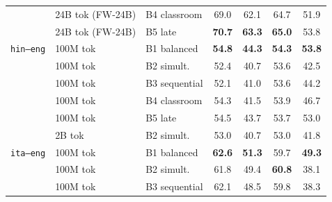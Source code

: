 \begin{table}[t]
\begin{minipage}[t]{0.49\linewidth}
\begin{tabular}{ll l cccc}
 & 24B tok (FW-24B) & B4 classroom & \cellcolor[rgb]{0.804,1.000,0.804} 69.0 & \cellcolor[rgb]{0.852,1.000,0.852} 62.1 & \cellcolor[rgb]{0.805,1.000,0.805} 64.7 & \cellcolor[rgb]{1.000,0.961,0.961} 51.9 \\
 & 24B tok (FW-24B) & B5 late & \cellcolor[rgb]{0.787,1.000,0.787} \textbf{70.7} & \cellcolor[rgb]{0.843,1.000,0.843} \textbf{63.3} & \cellcolor[rgb]{0.802,1.000,0.802} \textbf{65.0} & \cellcolor[rgb]{1.000,0.942,0.942} 53.8 \\
\midrule
\midrule
\texttt{hin--eng} & 100M tok & B1 balanced & \cellcolor[rgb]{0.950,1.000,0.950} \textbf{54.8} & \cellcolor[rgb]{1.000,0.945,0.945} \textbf{44.3} & \cellcolor[rgb]{0.943,1.000,0.943} \textbf{54.3} & \cellcolor[rgb]{0.922,1.000,0.922} \textbf{53.8} \\
 & 100M tok & B2 simult. & \cellcolor[rgb]{0.975,1.000,0.975} 52.4 & \cellcolor[rgb]{1.000,0.910,0.910} 40.7 & \cellcolor[rgb]{0.952,1.000,0.952} 53.6 & \cellcolor[rgb]{1.000,0.917,0.917} 42.5 \\
 & 100M tok & B3 sequential & \cellcolor[rgb]{0.978,1.000,0.978} 52.1 & \cellcolor[rgb]{1.000,0.913,0.913} 41.0 & \cellcolor[rgb]{0.952,1.000,0.952} 53.6 & \cellcolor[rgb]{1.000,0.936,0.936} 44.2 \\
 & 100M tok & B4 classroom & \cellcolor[rgb]{0.955,1.000,0.955} 54.3 & \cellcolor[rgb]{1.000,0.918,0.918} 41.5 & \cellcolor[rgb]{0.948,1.000,0.948} 53.9 & \cellcolor[rgb]{1.000,0.964,0.964} 46.7 \\
 & 100M tok & B5 late & \cellcolor[rgb]{0.953,1.000,0.953} 54.5 & \cellcolor[rgb]{1.000,0.939,0.939} 43.7 & \cellcolor[rgb]{0.951,1.000,0.951} 53.7 & \cellcolor[rgb]{0.939,1.000,0.939} 53.0 \\
\addlinespace[1.5pt]
 & 2B tok & B2 simult. & \cellcolor[rgb]{0.969,1.000,0.969} 53.0 & \cellcolor[rgb]{1.000,0.910,0.910} 40.7 & \cellcolor[rgb]{0.960,1.000,0.960} 53.0 & \cellcolor[rgb]{1.000,0.910,0.910} 41.8 \\
\midrule
\texttt{ita--eng} & 100M tok & B1 balanced & \cellcolor[rgb]{0.869,1.000,0.869} \textbf{62.6} & \cellcolor[rgb]{0.984,1.000,0.984} \textbf{51.3} & \cellcolor[rgb]{0.872,1.000,0.872} 59.7 & \cellcolor[rgb]{1.000,0.992,0.992} \textbf{49.3} \\
 & 100M tok & B2 simult. & \cellcolor[rgb]{0.877,1.000,0.877} 61.8 & \cellcolor[rgb]{1.000,0.994,0.994} 49.4 & \cellcolor[rgb]{0.857,1.000,0.857} \textbf{60.8} & \cellcolor[rgb]{1.000,0.869,0.869} 38.1 \\
 & 100M tok & B3 sequential & \cellcolor[rgb]{0.874,1.000,0.874} 62.1 & \cellcolor[rgb]{1.000,0.986,0.986} 48.5 & \cellcolor[rgb]{0.870,1.000,0.870} 59.8 & \cellcolor[rgb]{1.000,0.871,0.871} 38.3 \\

\end{tabular}
\end{minipage}
\end{table}

